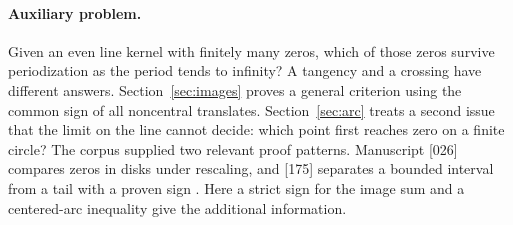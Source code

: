 \documentclass[11pt]{article}
\theoremstyle{plain}\newtheorem{theorem}{Theorem}[section]\newtheorem{lemma}[theorem]{Lemma}\newtheorem{corollary}[theorem]{Corollary}\newtheorem{proposition}[theorem]{Proposition}
\numberwithin{equation}{section}
\begin{document}
\paragraph{Auxiliary problem.} Given an even line kernel with finitely many zeros, which of those zeros survive periodization as the period tends to infinity? A tangency and a crossing have different answers. Section~\ref{sec:images} proves a general criterion using the common sign of all noncentral translates. Section~\ref{sec:arc} treats a second issue that the limit on the line cannot decide: which point first reaches zero on a finite circle? The corpus supplied two relevant proof patterns. Manuscript [026] compares zeros in disks under rescaling, and [175] separates a bounded interval from a tail with a proven sign \cite{vmrc}. Here a strict sign for the image sum and a centered-arc inequality give the additional information.
\end{document}
